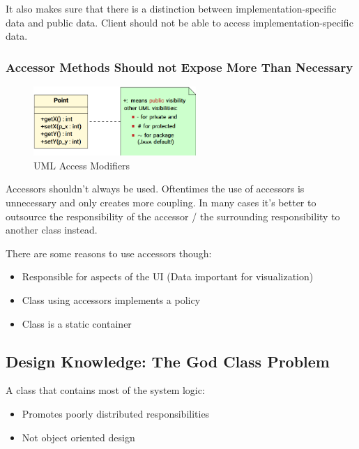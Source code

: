 \documentclass[
../../Software_Engineering_Summary.tex,
]
{subfiles}
\begin{document}
It also makes sure that there is a distinction between implementation-specific data and public data. Client should not be able to access implementation-specific data.

\subsubsection{Accessor Methods Should not Expose More Than Necessary}
\begin{figure}
    [htp]
    \centering
    \includegraphics[width = 0.55\textwidth]{Pics/UMLAccessModifiers.png}
    \caption{UML Access Modifiers}
\end{figure}

Accessors shouldn't always be used. Oftentimes the use of accessors is unnecessary and only creates more coupling. In many cases it's better to outsource the responsibility of the accessor / the surrounding responsibility to another class instead.

There are some reasons to use accessors though:
\begin{itemize}
    \item Responsible for aspects of the UI (Data important for visualization)
    \item Class using accessors implements a policy
    \item Class is a static container
\end{itemize}

\subsection{Design Knowledge: The God Class Problem}

\begin{defbox}
    A class that contains most of the system logic:
    \begin{itemize}
        \item Promotes poorly distributed responsibilities
        \item Not object oriented design
    \end{itemize}
\end{defbox}
\end{document}
